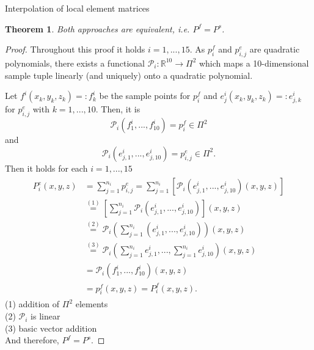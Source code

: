 \documentclass[a4paper,11pt,reqno]{amsart}
\numberwithin{figure}{section}
\numberwithin{table}{section}
\numberwithin{figure}{section}
\def\RR{\mathbb{R}}
\def\P{\mathcal{P}}
\newtheorem{theorem}{Theorem}
\begin{document}
\begin{section}{Interpolation of local element matrices}
\begin{theorem}
\label{theorem:equivalence}
Both approaches are equivalent, i.e. $P^f = P^s$.
\end{theorem}
\begin{proof}
Throughout this proof it holds $i = 1,...,15$.
As $p^f_i$ and $p^e_{i,j}$ are quadratic polynomials, there exists 
a functional $\P_i : \RR^{10} \rightarrow \Pi^2$ which maps a
10-dimensional sample tuple linearly (and uniquely) 
onto a quadratic polynomial.

Let $f^i(x_k,y_k,z_k) =:f_k^i$ be the sample points
for $p^f_i$ and $e^i_j(x_k,y_k,z_k) =:e_{j,k}^i$ for $p^e_{i,j}$
with $k = 1,...,10$.
Then, it is
\begin{equation*}
\P_i(f^i_1,...,f^i_{10}) = p_i^f \in \Pi^2
\end{equation*}
and
\begin{equation*}
\P_i(e^i_{j,1},...,e^i_{j,10}) = p_{i,j}^e \in \Pi^2.
\end{equation*}
Then it holds for each $i= 1,...,15$
\begin{align*}
\begin{split}
P^e_i(x,y,z) &= \sum_{j=1}^{n_i} p^e_{i,j} 
 = \sum_{j=1}^{n_i}\left[\P_i\left(e^i_{j,1},...,e^i_{j,10}\right)(x,y,z)\right] \\
 &\stackrel{(1)}{=} \left[\sum_{j=1}^{n_i}\P_i\left(e^i_{j,1},...,e^i_{j,10}\right)\right](x,y,z) \\
 &\stackrel{(2)}{=} \P_i\left(\sum_{j=1}^{n_i}\left(e^i_{j,1},...,e^i_{j,10}\right)\right)(x,y,z) \\
 &\stackrel{(3)}{=} \P_i\left(\sum_{j=1}^{n_i}e^i_{j,1},...,\sum_{j=1}^{n_i}e^i_{j,10}\right)(x,y,z) \\
 &= \P_i\left(f^i_1,...,f^i_{10}\right)(x,y,z) \\
 &= p_i^f(x,y,z) = P_i^f(x,y,z).
\end{split}
\end{align*}
(1) addition of $\Pi^2$ elements\\
(2) $\P_i$ is linear \\
(3) basic vector addition\\
And therefore, $P^f = P^s$.
\end{proof}

\end{section}





\end{document}
